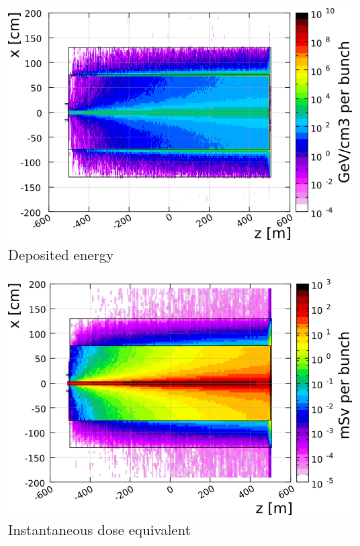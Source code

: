 \begin{figure}[!h]
 \centering
  \begin{subfigure}[b]{0.49\textwidth}
   \centering
    \includegraphics[width=\textwidth]{Figures/BeamDump/Gasdump/Energy.png}
   \caption{Deposited energy}
   \end{subfigure}
   \hfill
   \begin{subfigure}[b]{0.49\textwidth}
   \centering
    \includegraphics[width=\textwidth]{Figures/BeamDump/Gasdump/Dose_eq.png}
   \caption{Instantaneous dose equivalent}
   \end{subfigure}\\
    \begin{subfigure}[b]{0.49\textwidth}
   \centering

\end{subfigure}
\end{figure}
